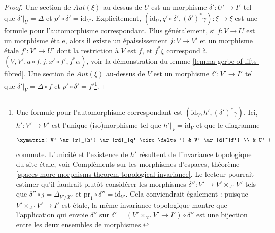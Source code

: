\begin{proof}
\medskip\noindent
Une section de $\mathit{Aut}(\xi)$ au-dessus de $U$ est un morphisme $\delta' : U' \to I'$
tel que $\delta'|_U = \Delta$ et
$p' \circ \delta' = \text{id}_{U'}$. Explicitement,
$(\text{id}_U, q' \circ \delta', (\delta')^*\gamma) : \xi \to \xi$
est une formule pour l'automorphisme correspondant.
Plus généralement, si
$f : V \to U$ est un morphisme \'etale, alors il existe un épaississement
$j : V \to V'$ et un morphisme \'etale
$f' : V' \to U'$ dont la restriction à $V$ est $f$, et $f^*\xi$
correspond à $(V, V', a \circ f, j, x' \circ f', f^*\alpha)$, voir la démonstration du
lemme \ref{lemma-gerbe-of-lifts-fibred}.
Une section de $\mathit{Aut}(\xi)$ au-dessus de $V$ est un morphisme
$\delta' : V' \to I'$
tel que $\delta'|_V = \Delta \circ f$
et $p' \circ \delta' = f'$\footnote{Une formule pour l'automorphisme
correspondant est $(\text{id}_V, h', (\delta')^*\gamma)$.
Ici, $h' : V' \to V'$ est l'unique (iso)morphisme tel que
$h'|_V = \text{id}_V$ et que le diagramme
$$
\xymatrix{
V' \ar[r]_{h'} \ar[rd]_{q' \circ \delta'} & V' \ar[d]^{f'} \\
& U'
}
$$
commute. L'unicité et l'existence de $h'$ résultent de l'invariance topologique
du site \'etale, voir Compléments sur les morphismes d'espaces,
théorème \ref{spaces-more-morphisms-theorem-topological-invariance}.
Le lecteur pourrait estimer qu'il faudrait plutôt considérer les morphismes
$\delta'' : V' \to V' \times_{\mathcal{X}'} V'$ tels que
$\delta'' \circ j = \Delta_{V'/\mathcal{X}'}$ et
$\text{pr}_1 \circ \delta'' = \text{id}_{V'}$.
Cela conviendrait également : puisque $V' \times_{\mathcal{X}'} V' \to I'$ est \'etale,
la même invariance topologique montre que l'application qui envoie
$\delta''$ sur $\delta' = (V' \times_{\mathcal{X}'} V' \to I') \circ \delta''$
est une bijection entre les deux
ensembles de morphismes.}.


\end{proof}
